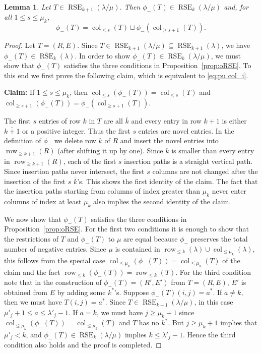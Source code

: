\documentclass{amsart}
\numberwithin{equation}{section}
\newtheorem{lem}[thm]{Lemma}
\theoremstyle{definition}
\newcommand\oRSE{\overline{\RSE}}
\newcommand\col{\operatorname{col}}
\newcommand\row{\operatorname{row}}
\newcommand\pu{\phi_-}
\newcommand\RSE{\operatorname{RSE}}
\newcommand\lm{{\lambda/\mu}}
\begin{document}
\begin{lem}\label{lem:pu}
  Let $T\in\RSE_{k+1}(\lm)$. Then $\pu(T)\in \RSE_{k}(\lm)$ and, for all $1\le
  s\le \mu_k$, 
  \begin{equation}
    \label{eq:pu col_i}
    \pu(T) = \col_{\le s}(T) \sqcup \pu(\col_{\ge s+1}(T)).    
  \end{equation}
\end{lem}
\begin{proof}
  Let $T=(R,E)$. Since $T\in\RSE_{k+1}(\lm)\subseteq\oRSE_{k+1}(\lambda)$, we
  have $\pu(T)\in\oRSE_{k}(\lambda)$. In order to show $\pu(T)\in
  \RSE_{k}(\lm)$, we must show that $\pu(T)$ satisfies the three conditions in
  Proposition~\ref{prop:oRSE}. To this end we first prove the following claim,
  which is equivalent to \eqref{eq:pu col_i}.

  \textbf{Claim:} If $1\le s\le\mu_k$, then $\col_{\le s}(\pu(T))= \col_{\le
    s}(T)$ and $\col_{\ge s+1}(\pu(T)) = \pu(\col_{\ge s+1}(T))$.

  The first $s$ entries of row $k$ in $T$ are all $\overline{k}$ and every entry
  in row $k+1$ is either $\overline{k+1}$ or a positive integer. Thus the first
  $s$ entries are novel entries. In the definition of $\pu$ we delete row $k$ of
  $R$ and insert the novel entries into $\row_{\ge k+1}(R)$ (after shifting it
  up by one). Since $\overline{k}$ is smaller than every entry in $\row_{\ge
    k+1}(R)$, each of the first $s$ insertion paths is a straight vertical path.
  Since insertion paths never intersect, the first $s$ columns are not changed
  after the insertion of the first $s$ $\overline{k}$'s. This shows the first
  identity of the claim. The fact that the insertion paths starting from columns
  of index greater than $\mu_k$ never enter columns of index at least $\mu_k$
  also implies the second identity of the claim.

  We now show that $\pu(T)$ satisfies the three conditions in
  Proposition~\ref{prop:oRSE}. For the first two conditions it is enough to show
  that the restrictions of $T$ and $\pu(T)$ to $\mu$ are equal because $\pu$
  preserves the total number of negative entries. Since $\mu$ is contained in
  $\row_{\le k}(\lambda)\cup \col_{\le \mu_k}(\lambda)$, this follows from the
  special case $\col_{\le \mu_k}(\pu(T))= \col_{\le \mu_k}(T)$ of the claim and
  the fact $\row_{\le k}(\pu(T))=\row_{\le k}(T)$. For the third condition note
  that in the construction of $\pu(T)=(R',E')$ from $T=(R,E)$, $E'$ is obtained
  from $E$ by adding some $k^*$'s. Suppose $\pu(T)(i,j)=a^*$. If $a\ne k$, then
  we must have $T(i,j)=a^*$. Since $T\in\RSE_{k+1}(\lm)$, in this case
  $\mu'_j+1\le a\le \lambda'_j-1$. If $a=k$, we must have $j\ge \mu_k+1$ since
  $\col_{\le \mu_k}(\pu(T))=\col_{\le \mu_k}(T)$ and $T$ has no $k^*$. But $j\ge
  \mu_k+1$ implies that $\mu'_j<k$, and $\pu(T)\in\oRSE_{k}(\lm)$ implies $k\le
  \lambda'_j-1$. Hence the third condition also holds and the proof is
  completed.
\end{proof}
\end{document}
